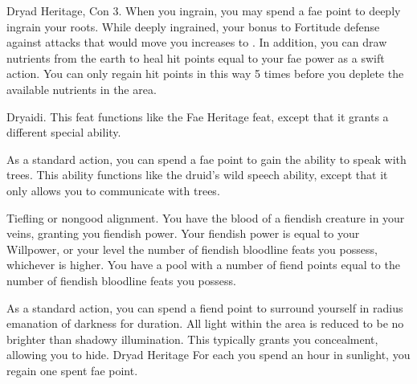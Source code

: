     \featpres Dryad Heritage, Con 3.
    \featben When you ingrain, you may spend a fae point to deeply ingrain your roots. While deeply ingrained, your bonus to Fortitude defense against attacks that would move you increases to . In addition, you can draw nutrients from the earth to heal hit points equal to your fae power as a swift action. You can only regain hit points in this way 5 times before you deplete the available nutrients in the area.

    \featpre Dryaidi.
    \featben This feat functions like the Fae Heritage feat, except that it grants a different special ability.

    As a standard action, you can spend a fae point to gain the ability to speak with trees. This ability functions like the druid's wild speech ability, except that it only allows you to communicate with trees.

    \featpre Tiefling or nongood alignment.
    \featben You have the blood of a fiendish creature in your veins, granting you fiendish power.
    Your fiendish power is equal to your Willpower, or your level \add the number of fiendish bloodline feats you possess, whichever is higher.
    You have a pool with a number of fiend points equal to the number of fiendish bloodline feats you possess.

    As a standard action, you can spend a fiend point to surround yourself in \areamed radius emanation of darkness for \durshort duration.
    All light within the area is reduced to be no brighter than shadowy illumination.
    This typically grants you concealment, allowing you to hide.
    \featpre Dryad Heritage
    \featben For each you spend an hour in sunlight, you regain one spent fae point.
